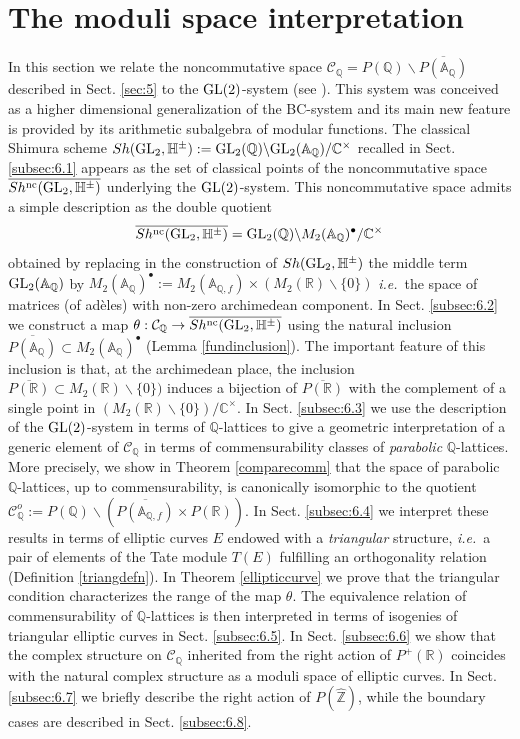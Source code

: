 \documentclass[graybox, envcountsect%
]{svmult}
\def\GL{{\rm GL}}
\def\A{{\mathbb A}}
\def\C{{\mathbb C}}
\def\Q{{\mathbb Q}}
\def\R{{\mathbb R}}
\def\Z{{\mathbb Z}}
\def\H{{\mathbb H}}
\def\cC{{\mathcal C}}
\def\caq{{\cC_\Q}}
\def\caqo{{\cC_\Q^o}}
\newcommand{\ie}{{\it i.e.\/}\ }
\begin{document}
\section{The moduli space interpretation}\label{sec:6}

In this section we relate the noncommutative space $\caq=P(\Q)\backslash
\overline{P(\A_\Q)}$ described in  Sect. \ref{sec:5} to the $\GL(2)$-system (see \cite{cmbook}). This system was conceived as a higher dimensional generalization of the BC-system \cite{BC} and its main new feature is provided by its arithmetic subalgebra of modular functions. The classical Shimura scheme $Sh(\GL_2,\H^\pm):=\GL_2(\Q)\backslash \GL_2(\A_{\Q})/\C^\times$ recalled in Sect. \ref{subsec:6.1} appears as the set of classical points of the noncommutative space $\overline{Sh^{\rm nc}(\GL_2,\H^\pm)}$ underlying the $\GL(2)$-system.    
This noncommutative space  admits a simple description as the double quotient
\[
\overline{Sh^{\rm nc}(\GL_2,\H^\pm)}= \GL_2(\Q)\backslash
M_2(\A_\Q)^\bullet /\C^\times
\]
 obtained by replacing  in the construction of $Sh(\GL_2,\H^\pm)$ the middle term $\GL_2(\A_{\Q})$ by $M_2(\A_\Q)^\bullet:= M_2(\A_{\Q,f})\times (M_2(\R)\smallsetminus
\{0 \})$ \ie the space of matrices (of ad\`eles) with non-zero archimedean component. \newline
 In Sect. \ref{subsec:6.2} we construct a map $\theta:\caq\to \overline{Sh^{\rm nc}(\GL_2,\H^\pm)}$ using the natural inclusion $\overline{P(\A_\Q)}\subset M_2(\A_\Q)^\bullet$ (Lemma \ref{fundinclusion}). The important feature of this inclusion is that, at the archimedean place, the inclusion $\overline{P(\R)}\subset M_2(\R)\smallsetminus
\{0 \})$ induces a bijection of $\overline{P(\R)}$ with the complement of a single point in $(M_2(\R)\smallsetminus
\{0 \})/\C^\times$.\newline
  In Sect. \ref{subsec:6.3} we use the description of the $\GL(2)$-system in terms of $\Q$-lattices to give a geometric interpretation of a generic element of $\caq$ in terms of commensurability classes of {\em parabolic} $\Q$-lattices. More precisely, we show in Theorem \ref{comparecomm} that the space of parabolic $\Q$-lattices, up to commensurability, is canonically isomorphic to the quotient 
$
\caqo:=P(\Q)\backslash (\overline{P(\A_{\Q,f})}\times P(\R))
$.\newline
 In Sect. \ref{subsec:6.4} we interpret these results in terms of  elliptic curves $E$ endowed with a  {\em triangular} structure, \ie a pair of elements of the Tate module $T(E)$ fulfilling an orthogonality relation (Definition \ref{triangdefn}). In Theorem \ref{ellipticcurve} we prove that the triangular condition characterizes the range of the map $\theta$.
  The equivalence relation of commensurability of $\Q$-lattices is then interpreted in terms of isogenies of triangular elliptic curves in Sect. \ref{subsec:6.5}. \newline
    In Sect. \ref{subsec:6.6} we show that the complex structure on $\caq$ inherited from the right action of $P^+(\R)$ coincides with the natural complex structure as a moduli space of elliptic curves. In Sect. \ref{subsec:6.7} we briefly describe the right action of $P(\hat \Z)$, while the boundary cases are described in Sect. \ref{subsec:6.8}.
\end{document}
